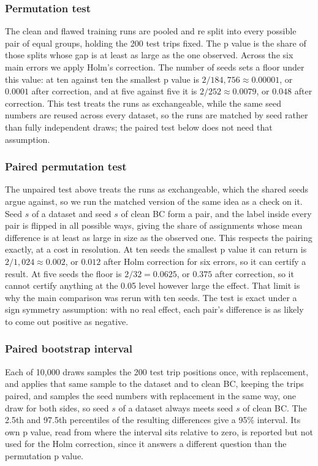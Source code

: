 \documentclass[conference]{IEEEtran}
\begin{document}
\subsubsection{Permutation test}
The clean and flawed training runs are pooled and re split into every possible pair of equal groups, holding the
200 test trips fixed. The p value is the share of those splits whose gap is at least as large as the one
observed. Across the six main errors we apply Holm's correction. The number of seeds sets a floor under this
value: at ten against ten the smallest p value is $2/184{,}756\approx0.00001$, or $0.0001$ after correction, and
at five against five it is $2/252\approx0.0079$, or $0.048$ after correction. This test treats the runs as
exchangeable, while the same seed numbers are reused across every dataset, so the runs are matched by seed rather
than fully independent draws; the paired test below does not need that assumption.

\subsubsection{Paired permutation test}
The unpaired test above treats the runs as exchangeable, which the shared seeds argue against, so we run the
matched version of the same idea as a check on it. Seed $s$ of a dataset and seed $s$ of clean BC form a pair,
and the label inside every pair is flipped in all possible ways, giving the share of assignments whose mean
difference is at least as large in size as the observed one. This respects the pairing exactly, at a cost in
resolution. At ten seeds the smallest p value it can return is $2/1{,}024\approx0.002$, or $0.012$ after Holm
correction for six errors, so it can certify a result. At five seeds the floor is $2/32=0.0625$, or $0.375$ after
correction, so it cannot certify anything at the 0.05 level however large the effect. That limit is why the main
comparison was rerun with ten seeds. The test is exact under a sign symmetry assumption: with no real effect,
each pair's difference is as likely to come out positive as negative.

\subsubsection{Paired bootstrap interval}
Each of 10{,}000 draws samples the 200 test trip positions once, with replacement, and applies that same sample
to the dataset and to clean BC, keeping the trips paired, and samples the seed numbers with replacement in the
same way, one draw for both sides, so seed $s$ of a dataset always meets seed $s$ of clean BC. The
2.5th and 97.5th percentiles of the resulting differences give a 95\% interval. Its own p value, read from where
the interval sits relative to zero, is reported but not used for the Holm correction, since it answers a
different question than the permutation p value.
\end{document}
